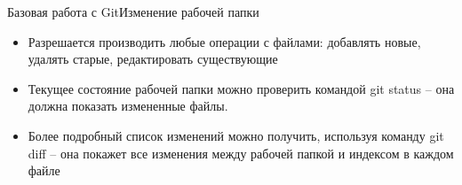 \begin{frame}{Базовая работа с Git}{Изменение рабочей папки}
    \begin{itemize}
        \item
        Разрешается производить любые операции с файлами: добавлять новые, удалять старые, редактировать существующие
        \item
        Текущее состояние рабочей папки можно проверить командой git status -- она должна показать измененные файлы.
        \item
        Более подробный список изменений можно получить, используя команду git diff -- она покажет все изменения между рабочей папкой и индексом в каждом файле
    \end{itemize}
\end{frame}